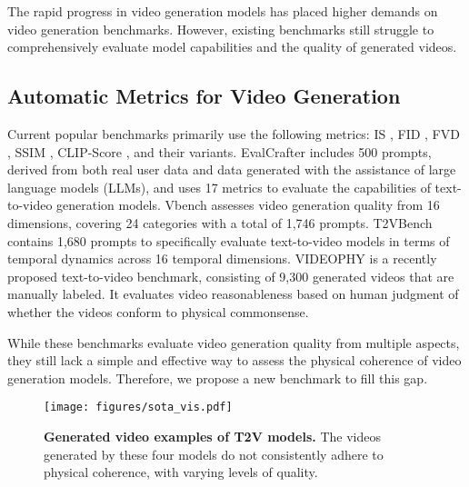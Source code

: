 The rapid progress in video generation models has placed higher demands on video generation benchmarks. However, existing benchmarks still struggle to comprehensively evaluate model capabilities and the quality of generated videos.




\subsection{Automatic Metrics for Video Generation}

Current popular benchmarks primarily use the following metrics: IS \cite{IS}, FID \cite{FID}, FVD \cite{FVD}, SSIM \cite{SSIM}, CLIP-Score \cite{clipscore}, and their variants. EvalCrafter \cite{evalcrafter} includes 500 prompts, derived from both real user data and data generated with the assistance of large language models (LLMs), and uses 17 metrics to evaluate the capabilities of text-to-video generation models. Vbench \cite{2024vbench} assesses video generation quality from 16 dimensions, covering 24 categories with a total of 1,746 prompts. T2VBench \cite{t2vbench} contains 1,680 prompts to specifically evaluate text-to-video models in terms of temporal dynamics across 16 temporal dimensions. VIDEOPHY \cite{videophy} is a recently proposed text-to-video benchmark, consisting of 9,300 generated videos that are manually labeled. It evaluates video reasonableness based on human judgment of whether the videos conform to physical commonsense.

While these benchmarks evaluate video generation quality from multiple aspects, they still lack a simple and effective way to assess the physical coherence of video generation models. Therefore, we propose a new benchmark to fill this gap.


\begin{figure*}[ht]
\centering
\texttt{[image: figures/sota\_vis.pdf]}
\caption{\textbf{Generated video examples of T2V models.} The videos generated by these four models do not consistently adhere to physical coherence, with varying levels of quality.}
\label{fig:sota_vis}
\end{figure*}